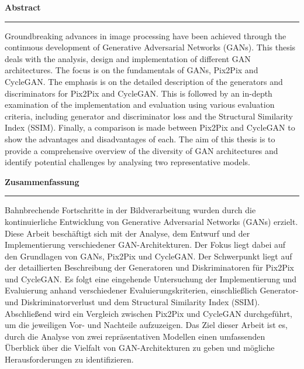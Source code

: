 
\begin{addmargin}[0cm]{0cm}
		\begin{center}
			\LARGE{\textbf{Abstract}}\\
			\rule{\textwidth}{0.04cm}	
		\end{center}

Groundbreaking advances in image processing have been achieved through the continuous development of Generative Adversarial Networks (GANs). This thesis deals with the analysis, design and implementation of different GAN architectures. The focus is on the fundamentals of GANs, Pix2Pix and CycleGAN. The emphasis is on the detailed description of the generators and discriminators for Pix2Pix and CycleGAN. This is followed by an in-depth examination of the implementation and evaluation using various evaluation criteria, including generator and discriminator loss and the Structural Similarity Index (SSIM). Finally, a comparison is made between Pix2Pix and CycleGAN to show the advantages and disadvantages of each. The aim of this thesis is to provide a comprehensive overview of the diversity of GAN architectures and identify potential challenges by analysing two representative models.

\vspace{1cm}  

\begin{center}
			\LARGE{\textbf{Zusammenfassung}}\\
			\rule{\textwidth}{0.04cm}	
		\end{center}

Bahnbrechende Fortschritte in der Bildverarbeitung wurden durch die kontinuierliche Entwicklung von Generative Adversarial Networks (GANs) erzielt. Diese Arbeit beschäftigt sich mit der Analyse, dem Entwurf und der Implementierung verschiedener GAN-Architekturen. Der Fokus liegt dabei auf den Grundlagen von GANs, Pix2Pix und CycleGAN. Der Schwerpunkt liegt auf der detaillierten Beschreibung der Generatoren und Diskriminatoren für Pix2Pix und CycleGAN. Es folgt eine eingehende Untersuchung der Implementierung und Evaluierung anhand verschiedener Evaluierungskriterien, einschließlich Generator- und Diskriminatorverlust und dem Structural Similarity Index (SSIM). Abschließend wird ein Vergleich zwischen Pix2Pix und CycleGAN durchgeführt, um die jeweiligen Vor- und Nachteile aufzuzeigen. Das Ziel dieser Arbeit ist es, durch die Analyse von zwei repräsentativen Modellen einen umfassenden Überblick über die Vielfalt von GAN-Architekturen zu geben und mögliche Herausforderungen zu identifizieren.

\end{addmargin}
\cleardoublepage